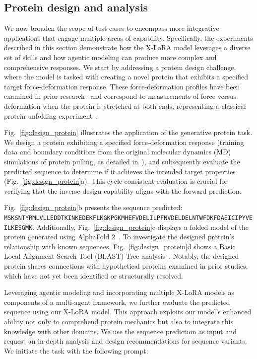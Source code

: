 \subsection{Protein design and analysis}

We now broaden the scope of test cases to encompass more integrative applications that engage multiple areas of capability. Specifically, the experiments described in this section demonstrate how the X-LoRA model leverages a diverse set of skills and how agentic modeling can produce more complex and comprehensive responses. We start by addressing a protein design challenge, where the model is tasked with creating a novel protein that exhibits a specified target force-deformation response. These force-deformation profiles have been examined in prior research~\cite{Ni2023ForceGen:Model} and correspond to measurements of force versus deformation when the protein is stretched at both ends, representing a classical protein unfolding experiment~\cite{Lu1998UnfoldingSimulation.}.

Fig.~\ref{fig:design_protein} illustrates the application of the generative protein task. We design a protein exhibiting a specified force-deformation response (training data and boundary conditions from the original molecular dynamics (MD) simulations of protein pulling, as detailed in~\cite{Ni2023ForceGen:Model}), and subsequently evaluate the predicted sequence to determine if it achieves the intended target properties (Fig.~\ref{fig:design_protein}a). This cycle-consistent evaluation is crucial for verifying that the inverse design capability aligns with the forward prediction.

Fig.~\ref{fig:design_protein}b presents the sequence predicted: \texttt{MSKSNTYRMLVLLEDDTKINKEDEKFLKGKPGKMHEFVDELILPFNVDELDELNTWFDKFDAEICIPYVEILKESGMK}. Additionally, Fig.~\ref{fig:design_protein}c displays a folded model of the protein generated using AlphaFold 2~\cite{Jumper2021HighlyAlphaFoldb}. To investigate the designed protein's relationship with known sequences, Fig.~\ref{fig:design_protein}d shows a Basic Local Alignment Search Tool (BLAST) Tree analysis~\cite{Altschul1990BasicTool}. Notably, the designed protein shares connections with hypothetical proteins examined in prior studies, which have not yet been identified or structurally resolved.

Leveraging agentic modeling and incorporating multiple X-LoRA models as components of a multi-agent framework, we further evaluate the predicted sequence using our X-LoRA model. This approach exploits our model’s enhanced ability not only to comprehend protein mechanics but also to integrate this knowledge with other domains. We use the sequence prediction as input and request an in-depth analysis and design recommendations for sequence variants. We initiate the task with the following prompt:

